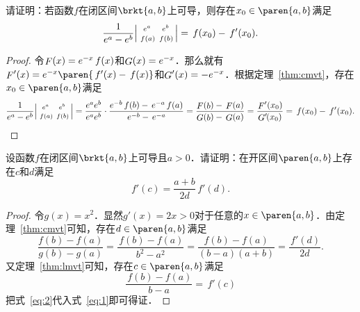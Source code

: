 \begin{example*}
  请证明：若函数\(f\)在闭区间\(\brkt{a,b}\)上可导，则存在\(x_0 \in \paren{a,b}\)满足
  \begin{equation*}
    \frac{1}{e^a - e^b}
    \begin{vsmallmatrix}
      e^a & e^b \\
      \,f(a) & \,f(b) \rule{0ex}{2ex}
    \end{vsmallmatrix}
    = \,f(x_0) - \,f'(x_0).
  \end{equation*}

  \begin{proof}
    令\(\mathop{\relax F}\nolimits(x) = e^{-x}\,f(x)\)和\(\mathop{\relax G}\nolimits(x) = e^{-x}\)．那么就有\(\Fn F'(x) = e^{-x}\paren{\,f'(x) - \,f(x)}\)和\(\mathop{\relax G}\nolimits'(x) = -e^{-x}\)．根据定理~\ref{thm:cmvt}，存在\(x_0 \in \paren{a,b}\)满足
    \begin{equation*}
      \frac{1}{e^a - e^b}
      \begin{vsmallmatrix}
        e^a & e^b \\
        \,f(a) & \,f(b) \rule{0ex}{2ex}
      \end{vsmallmatrix}
      = \frac{e^a e^b}{e^a e^b}
      \cdot \frac{e^{-b}\,f(b) - \,e^{-a}\,f(a)}{\mkern.5mu e^{-b}-\,e^{-a}}
      = \frac{\Fn F(\Fn b) - \,\Fn F(a)}{\Fn G(\Fn b) - \,\Fn G(a)}
      = \frac{\mkern1mu\Fn F'(x_0)}{\Fn G'\mkern-2mu(x_0)}
      = \,f(x_0) - \,f'(x_0).
      \qedhere
    \end{equation*}
  \end{proof}
\end{example*}

\begin{example*}
  设函数\(f\)在闭区间\(\brkt{a,b}\)上可导且\(a > 0\)．请证明：在开区间\(\paren{a,b}\)上存在\(c\)和\(d\)满足
  \begin{equation*}
    f'(c) = \frac{a+b}{2d} \,f'(d).
  \end{equation*}

  \begin{proof}
    令\(g(x) = x^2\)．显然\(g'(x) = 2x > 0\)对于任意的\(x \in \paren{a,b}\)．由定理~\ref{thm:cmvt}可知，存在\(d \in \paren{a,b}\)满足
    \begin{equation}
      \frac{f(b)-f(a)}{g(b) - g(a)}
      = \frac{\,f(b)-f(a)}{b^2 - a^2}
      = \frac{f(b)-f(a)}{(b-a)(a+b)}
      = \frac{\,f'(d)}{2d}.
      \label{eq:1}
    \end{equation}
    又定理~\ref{thm:lmvt}可知，存在\(c \in \paren{a,b}\)满足
    \begin{equation}
      \frac{\,f(b)-f(a)}{b-a} = \,f'(c)
      \label{eq:2}
    \end{equation}
    把式~\eqref{eq:2}代入式~\eqref{eq:1}即可得证．
  \end{proof}
\end{example*}

